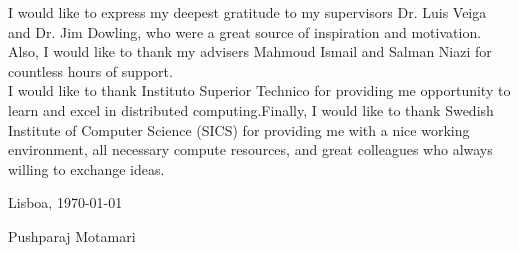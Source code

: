 I would like to express my deepest gratitude to my supervisors Dr. Luis Veiga and Dr. Jim Dowling, who were a great source of inspiration and motivation. Also, I
would like to thank my advisers Mahmoud Ismail and Salman Niazi for countless
hours of support.\\
\hspace{4 em}I would like to thank  Instituto Superior Technico for providing me opportunity to learn and excel in distributed computing.Finally, I would like to thank Swedish Institute of Computer Science (SICS)  for providing me with a nice working environment, all necessary compute
resources, and great colleagues who always willing to exchange ideas.


\vfill
\begin{flushright}
  \begin{minipage}{8cm}
    \begin{center}
      Lisboa, \today

      Pushparaj Motamari
    \end{center}
  \end{minipage}
\end{flushright}













